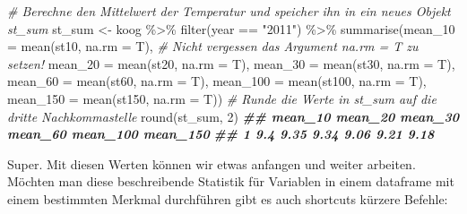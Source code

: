 \documentclass[
]{article}
\newenvironment{Shaded}{\begin{snugshade}}{\end{snugshade}}
\newcommand{\AttributeTok}[1]{\textcolor[rgb]{0.77,0.63,0.00}{#1}}
\newcommand{\CommentTok}[1]{\textcolor[rgb]{0.56,0.35,0.01}{\textit{#1}}}
\newcommand{\DecValTok}[1]{\textcolor[rgb]{0.00,0.00,0.81}{#1}}
\newcommand{\DocumentationTok}[1]{\textcolor[rgb]{0.56,0.35,0.01}{\textbf{\textit{#1}}}}
\newcommand{\FunctionTok}[1]{\textcolor[rgb]{0.00,0.00,0.00}{#1}}
\newcommand{\NormalTok}[1]{#1}
\newcommand{\OtherTok}[1]{\textcolor[rgb]{0.56,0.35,0.01}{#1}}
\newcommand{\SpecialCharTok}[1]{\textcolor[rgb]{0.00,0.00,0.00}{#1}}
\newcommand{\StringTok}[1]{\textcolor[rgb]{0.31,0.60,0.02}{#1}}
\begin{document}
\begin{Shaded}
\begin{Highlighting}[]
\CommentTok{\# Berechne den Mittelwert der Temperatur und speicher ihn in ein neues Objekt st\_sum}
\NormalTok{st\_sum }\OtherTok{\textless{}{-}}\NormalTok{ koog }\SpecialCharTok{\%\textgreater{}\%}
  \FunctionTok{filter}\NormalTok{(year }\SpecialCharTok{==} \StringTok{"2011"}\NormalTok{) }\SpecialCharTok{\%\textgreater{}\%}
  \FunctionTok{summarise}\NormalTok{(}\AttributeTok{mean\_10 =} \FunctionTok{mean}\NormalTok{(st10, }\AttributeTok{na.rm =}\NormalTok{ T), }\CommentTok{\# Nicht vergessen das Argument na.rm = T zu setzen!}
            \AttributeTok{mean\_20 =} \FunctionTok{mean}\NormalTok{(st20, }\AttributeTok{na.rm =}\NormalTok{ T),}
            \AttributeTok{mean\_30 =} \FunctionTok{mean}\NormalTok{(st30, }\AttributeTok{na.rm =}\NormalTok{ T),}
            \AttributeTok{mean\_60 =} \FunctionTok{mean}\NormalTok{(st60, }\AttributeTok{na.rm =}\NormalTok{ T),}
            \AttributeTok{mean\_100 =} \FunctionTok{mean}\NormalTok{(st100, }\AttributeTok{na.rm =}\NormalTok{ T),}
            \AttributeTok{mean\_150 =} \FunctionTok{mean}\NormalTok{(st150, }\AttributeTok{na.rm =}\NormalTok{ T))}
\CommentTok{\# Runde die Werte in st\_sum auf die dritte Nachkommastelle}
\FunctionTok{round}\NormalTok{(st\_sum, }\DecValTok{2}\NormalTok{)}
\DocumentationTok{\#\#   mean\_10 mean\_20 mean\_30 mean\_60 mean\_100 mean\_150}
\DocumentationTok{\#\# 1     9.4    9.35    9.34    9.06     9.21     9.18}
\end{Highlighting}
\end{Shaded}

Super. Mit diesen Werten können wir etwas anfangen und weiter arbeiten. Möchten man diese beschreibende Statistik für Variablen in einem dataframe mit einem bestimmten Merkmal durchführen gibt es auch shortcuts kürzere Befehle:
\end{document}
